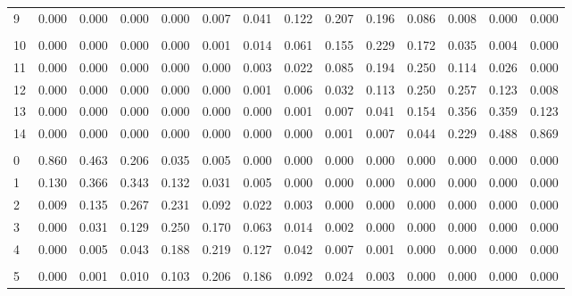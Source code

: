 \documentclass[
]{article}
\begin{document}
\begin{longtable}[t]{lrrrrrrrrrrrrr}
\hspace{1em}9 & 0.000 & 0.000 & 0.000 & 0.000 & 0.007 & 0.041 & 0.122 & 0.207 & 0.196 & 0.086 & 0.008 & 0.000 & 0.000\\
\addlinespace[-.7em]
\multicolumn{14}{l}{ }\\
\hspace{1em}10 & 0.000 & 0.000 & 0.000 & 0.000 & 0.001 & 0.014 & 0.061 & 0.155 & 0.229 & 0.172 & 0.035 & 0.004 & 0.000\\
\hspace{1em}11 & 0.000 & 0.000 & 0.000 & 0.000 & 0.000 & 0.003 & 0.022 & 0.085 & 0.194 & 0.250 & 0.114 & 0.026 & 0.000\\
\hspace{1em}12 & 0.000 & 0.000 & 0.000 & 0.000 & 0.000 & 0.001 & 0.006 & 0.032 & 0.113 & 0.250 & 0.257 & 0.123 & 0.008\\
\hspace{1em}13 & 0.000 & 0.000 & 0.000 & 0.000 & 0.000 & 0.000 & 0.001 & 0.007 & 0.041 & 0.154 & 0.356 & 0.359 & 0.123\\
\hspace{1em}14 & 0.000 & 0.000 & 0.000 & 0.000 & 0.000 & 0.000 & 0.000 & 0.001 & 0.007 & 0.044 & 0.229 & 0.488 & 0.869\\
\addlinespace[0.3em]
\multicolumn{14}{l}{$n=15$}\\
\hspace{1em}0 & 0.860 & 0.463 & 0.206 & 0.035 & 0.005 & 0.000 & 0.000 & 0.000 & 0.000 & 0.000 & 0.000 & 0.000 & 0.000\\
\hspace{1em}1 & 0.130 & 0.366 & 0.343 & 0.132 & 0.031 & 0.005 & 0.000 & 0.000 & 0.000 & 0.000 & 0.000 & 0.000 & 0.000\\
\hspace{1em}2 & 0.009 & 0.135 & 0.267 & 0.231 & 0.092 & 0.022 & 0.003 & 0.000 & 0.000 & 0.000 & 0.000 & 0.000 & 0.000\\
\hspace{1em}3 & 0.000 & 0.031 & 0.129 & 0.250 & 0.170 & 0.063 & 0.014 & 0.002 & 0.000 & 0.000 & 0.000 & 0.000 & 0.000\\
\hspace{1em}4 & 0.000 & 0.005 & 0.043 & 0.188 & 0.219 & 0.127 & 0.042 & 0.007 & 0.001 & 0.000 & 0.000 & 0.000 & 0.000\\
\addlinespace[-.7em]
\multicolumn{14}{l}{ }\\
\hspace{1em}5 & 0.000 & 0.001 & 0.010 & 0.103 & 0.206 & 0.186 & 0.092 & 0.024 & 0.003 & 0.000 & 0.000 & 0.000 & 0.000\\

\end{longtable}
\end{document}
